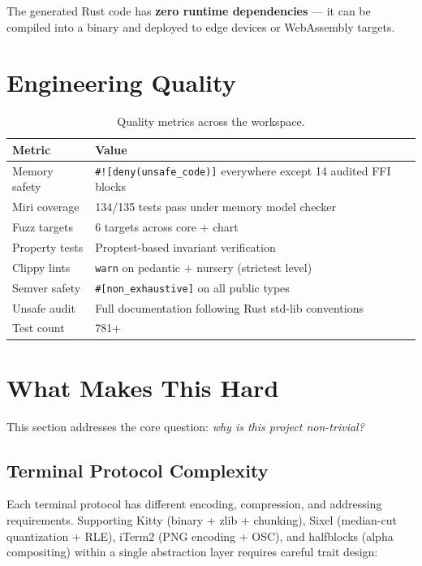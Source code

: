 \documentclass[11pt,a4paper]{article}
\begin{document}
The generated Rust code has \textbf{zero runtime dependencies} ---
it can be compiled into a binary and deployed to edge devices or
WebAssembly targets.

\section{Engineering Quality}

\begin{table}[H]
\centering
\caption{Quality metrics across the workspace.}
\small
\begin{tabular}{ll}
\toprule
\textbf{Metric} & \textbf{Value} \\
\midrule
Memory safety & \texttt{\#![deny(unsafe\_code)]} everywhere except 14 audited FFI blocks \\
Miri coverage & 134/135 tests pass under memory model checker \\
Fuzz targets & 6 targets across core + chart \\
Property tests & Proptest-based invariant verification \\
Clippy lints & \texttt{warn} on pedantic + nursery (strictest level) \\
Semver safety & \texttt{\#[non\_exhaustive]} on all public types \\
Unsafe audit & Full documentation following Rust std-lib conventions \\
Test count & 781+ \\
\bottomrule
\end{tabular}
\end{table}

\section{What Makes This Hard}

This section addresses the core question: \emph{why is this project
non-trivial?}

\subsection{Terminal Protocol Complexity}

Each terminal protocol has different encoding, compression, and
addressing requirements. Supporting Kitty (binary + zlib + chunking),
Sixel (median-cut quantization + RLE), iTerm2 (PNG encoding + OSC),
and halfblocks (alpha compositing) within a single abstraction layer
requires careful trait design:
\end{document}
